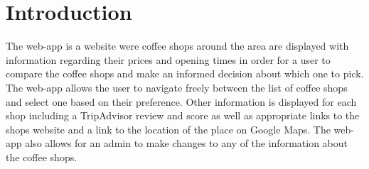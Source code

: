 \documentclass[10pt, a4paper]{article}
\title{\mytitle}
\author{\myauthor\hspace{1em}\\\contact\\Edinburgh Napier University\hspace{0.5em}-\hspace{0.5em}\mymodule}
\date{}
\begin{document}
	\maketitle
	\begin{abstract}
        For this coursework we were tasked with creating a web-app using Python Flask in conjunction with HTML, CSS and bootstrap.  The scope of this coursework was much bigger than the last so a number of new features will be used as well as covering the basic skills developed in the previous coursework.  This led to a much more diverse website with different ways for the user to interact with it.
	\end{abstract}
    

	\section{Introduction}
        The web-app is a website were coffee shops around the area are displayed with information regarding their prices and opening times in order for a user to compare the coffee shops and make an informed decision about which one to pick.  The web-app allows the user to navigate freely between the list of coffee shops and select one based on their preference.  Other information is displayed for each shop including a TripAdvisor review and score as well as appropriate links to the shops website and a link to the location of the place on Google Maps.  The web-app also allows for an admin to make changes to any of the information about the coffee shops.
\end{document}
